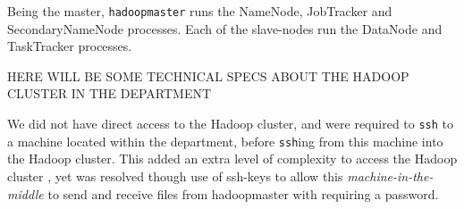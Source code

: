 Being the master, {\tt hadoopmaster} runs the NameNode, JobTracker and SecondaryNameNode processes. Each of the slave-nodes run the DataNode and TaskTracker processes.

HERE WILL BE SOME TECHNICAL SPECS ABOUT THE HADOOP CLUSTER IN THE DEPARTMENT

We did not have direct access to the Hadoop cluster, and were required to {\tt ssh} to a machine located within the department, before {\tt ssh}ing from this machine into the Hadoop cluster. This added an extra level of complexity to access the Hadoop cluster , yet was resolved though use of ssh-keys to allow this \emph{machine-in-the-middle} to send and receive files from hadoopmaster with requiring a password.